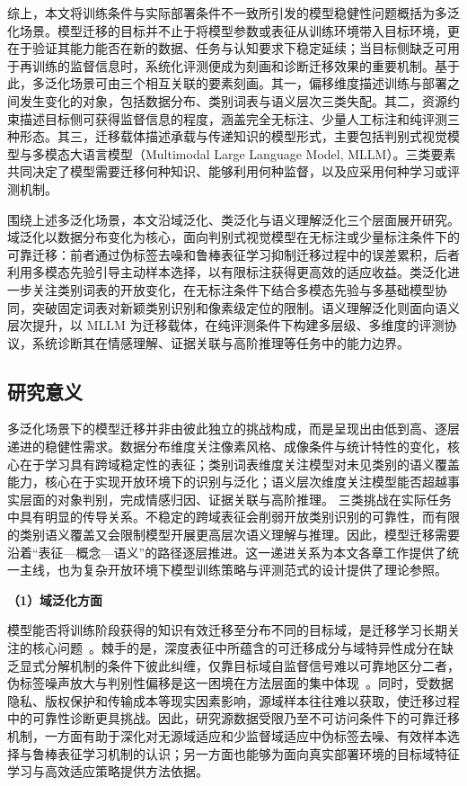 综上，本文将训练条件与实际部署条件不一致所引发的模型稳健性问题概括为多泛化场景。模型迁移的目标并不止于将模型参数或表征从训练环境带入目标环境，更在于验证其能力能否在新的数据、任务与认知要求下稳定延续；当目标侧缺乏可用于再训练的监督信息时，系统化评测便成为刻画和诊断迁移效果的重要机制。基于此，多泛化场景可由三个相互关联的要素刻画。其一，偏移维度描述训练与部署之间发生变化的对象，包括数据分布、类别词表与语义层次三类失配。其二，资源约束描述目标侧可获得监督信息的程度，涵盖完全无标注、少量人工标注和纯评测三种形态。其三，迁移载体描述承载与传递知识的模型形式，主要包括判别式视觉模型与多模态大语言模型（Multimodal Large Language Model, MLLM）。三类要素共同决定了模型需要迁移何种知识、能够利用何种监督，以及应采用何种学习或评测机制。

围绕上述多泛化场景，本文沿域泛化、类泛化与语义理解泛化三个层面展开研究。域泛化以数据分布变化为核心，面向判别式视觉模型在无标注或少量标注条件下的可靠迁移：前者通过伪标签去噪和鲁棒表征学习抑制迁移过程中的误差累积，后者利用多模态先验引导主动样本选择，以有限标注获得更高效的适应收益。类泛化进一步关注类别词表的开放变化，在无标注条件下结合多模态先验与多基础模型协同，突破固定词表对新颖类别识别和像素级定位的限制。语义理解泛化则面向语义层次提升，以 MLLM 为迁移载体，在纯评测条件下构建多层级、多维度的评测协议，系统诊断其在情感理解、证据关联与高阶推理等任务中的能力边界。


\subsection{研究意义}
多泛化场景下的模型迁移并非由彼此独立的挑战构成，而是呈现出由低到高、逐层递进的稳健性需求。数据分布维度关注像素风格、成像条件与统计特性的变化，核心在于学习具有跨域稳定性的表征；类别词表维度关注模型对未见类别的语义覆盖能力，核心在于实现开放环境下的识别与泛化；语义层次维度关注模型能否超越事实层面的对象判别，完成情感归因、证据关联与高阶推理。
三类挑战在实际任务中具有明显的传导关系。不稳定的跨域表征会削弱开放类别识别的可靠性，而有限的类别语义覆盖又会限制模型开展更高层次语义理解与推理。因此，模型迁移需要沿着“表征—概念—语义”的路径逐层推进。这一递进关系为本文各章工作提供了统一主线，也为复杂开放环境下模型训练策略与评测范式的设计提供了理论参照。

\noindent\textbf{（1）域泛化方面} 

模型能否将训练阶段获得的知识有效迁移至分布不同的目标域，是迁移学习长期关注的核心问题~\cite{liang2021source,ganin2016domain,long2015learning}。棘手的是，深度表征中所蕴含的可迁移成分与域特异性成分在缺乏显式分解机制的条件下彼此纠缠，仅靠目标域自监督信号难以可靠地区分二者，伪标签噪声放大与判别性偏移是这一困境在方法层面的集中体现~\cite{yang2021neighbor,kundu2022towards}。同时，受数据隐私、版权保护和传输成本等现实因素影响，源域样本往往难以获取，使迁移过程中的可靠性诊断更具挑战。因此，研究源数据受限乃至不可访问条件下的可靠迁移机制，一方面有助于深化对无源域适应和少监督域适应中伪标签去噪、有效样本选择与鲁棒表征学习机制的认识；另一方面也能够为面向真实部署环境的目标域特征学习与高效适应策略提供方法依据。

